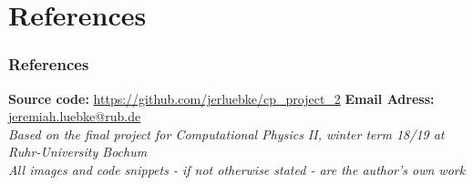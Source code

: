 \section{References}
\begin{frame}
    \frametitle{References}
    \textbf{Source code:} \url{https://github.com/jerluebke/cp_project_2}
    \textbf{Email Adress:} \url{jeremiah.luebke@rub.de}
    \vspace*{\baselineskip} \\
    {\footnotesize\textit{Based on the final project for Computational Physics
    II, winter term 18/19 at Ruhr-University Bochum}}
    \vspace*{\baselineskip} \\
    {\footnotesize\textit{All images and code snippets - if not otherwise stated - are
    the author's own work}}
\end{frame}

